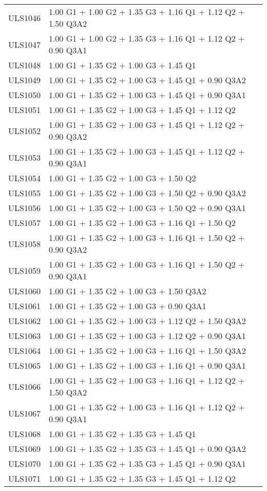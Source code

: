 \begin{center}
\begin{small}
\begin{longtable}{|l|p{10cm}|}
ULS1046 & 1.00 G1 + 1.00 G2 + 1.35 G3 + 1.16 Q1 + 1.12 Q2 + 1.50 Q3A2\\
ULS1047 & 1.00 G1 + 1.00 G2 + 1.35 G3 + 1.16 Q1 + 1.12 Q2 + 0.90 Q3A1\\
ULS1048 & 1.00 G1 + 1.35 G2 + 1.00 G3 + 1.45 Q1\\
ULS1049 & 1.00 G1 + 1.35 G2 + 1.00 G3 + 1.45 Q1 + 0.90 Q3A2\\
ULS1050 & 1.00 G1 + 1.35 G2 + 1.00 G3 + 1.45 Q1 + 0.90 Q3A1\\
ULS1051 & 1.00 G1 + 1.35 G2 + 1.00 G3 + 1.45 Q1 + 1.12 Q2\\
ULS1052 & 1.00 G1 + 1.35 G2 + 1.00 G3 + 1.45 Q1 + 1.12 Q2 + 0.90 Q3A2\\
ULS1053 & 1.00 G1 + 1.35 G2 + 1.00 G3 + 1.45 Q1 + 1.12 Q2 + 0.90 Q3A1\\
ULS1054 & 1.00 G1 + 1.35 G2 + 1.00 G3 + 1.50 Q2\\
ULS1055 & 1.00 G1 + 1.35 G2 + 1.00 G3 + 1.50 Q2 + 0.90 Q3A2\\
ULS1056 & 1.00 G1 + 1.35 G2 + 1.00 G3 + 1.50 Q2 + 0.90 Q3A1\\
ULS1057 & 1.00 G1 + 1.35 G2 + 1.00 G3 + 1.16 Q1 + 1.50 Q2\\
ULS1058 & 1.00 G1 + 1.35 G2 + 1.00 G3 + 1.16 Q1 + 1.50 Q2 + 0.90 Q3A2\\
ULS1059 & 1.00 G1 + 1.35 G2 + 1.00 G3 + 1.16 Q1 + 1.50 Q2 + 0.90 Q3A1\\
ULS1060 & 1.00 G1 + 1.35 G2 + 1.00 G3 + 1.50 Q3A2\\
ULS1061 & 1.00 G1 + 1.35 G2 + 1.00 G3 + 0.90 Q3A1\\
ULS1062 & 1.00 G1 + 1.35 G2 + 1.00 G3 + 1.12 Q2 + 1.50 Q3A2\\
ULS1063 & 1.00 G1 + 1.35 G2 + 1.00 G3 + 1.12 Q2 + 0.90 Q3A1\\
ULS1064 & 1.00 G1 + 1.35 G2 + 1.00 G3 + 1.16 Q1 + 1.50 Q3A2\\
ULS1065 & 1.00 G1 + 1.35 G2 + 1.00 G3 + 1.16 Q1 + 0.90 Q3A1\\
ULS1066 & 1.00 G1 + 1.35 G2 + 1.00 G3 + 1.16 Q1 + 1.12 Q2 + 1.50 Q3A2\\
ULS1067 & 1.00 G1 + 1.35 G2 + 1.00 G3 + 1.16 Q1 + 1.12 Q2 + 0.90 Q3A1\\
ULS1068 & 1.00 G1 + 1.35 G2 + 1.35 G3 + 1.45 Q1\\
ULS1069 & 1.00 G1 + 1.35 G2 + 1.35 G3 + 1.45 Q1 + 0.90 Q3A2\\
ULS1070 & 1.00 G1 + 1.35 G2 + 1.35 G3 + 1.45 Q1 + 0.90 Q3A1\\
ULS1071 & 1.00 G1 + 1.35 G2 + 1.35 G3 + 1.45 Q1 + 1.12 Q2\\

\end{longtable}
\end{small}
\end{center}

